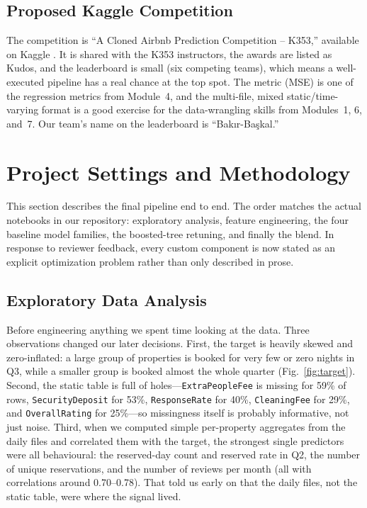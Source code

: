 \documentclass[journal]{IEEEtran}
\begin{document}
\subsection{Proposed Kaggle Competition}
The competition is ``A Cloned Airbnb Prediction Competition -- K353,'' available
on Kaggle \cite{k353comp}. It is shared with the K353 instructors, the awards
are listed as Kudos, and the leaderboard is small (six competing teams), which
means a well-executed pipeline has a real chance at the top spot. The metric
(MSE) is one of the regression metrics from Module~4, and the multi-file, mixed
static/time-varying format is a good exercise for the data-wrangling skills from
Modules~1, 6, and~7. Our team's name on the leaderboard is ``Bak{\i}r-Ba\c{s}kal.''

\section{Project Settings and Methodology}
\label{sec:method}
This section describes the final pipeline end to end. The order matches the
actual notebooks in our repository: exploratory analysis, feature engineering,
the four baseline model families, the boosted-tree retuning, and finally the
blend. In response to reviewer feedback, every custom component is now stated as
an explicit optimization problem rather than only described in prose.

\subsection{Exploratory Data Analysis}
Before engineering anything we spent time looking at the data. Three
observations changed our later decisions. First, the target is heavily skewed
and zero-inflated: a large group of properties is booked for very few or zero
nights in Q3, while a smaller group is booked almost the whole quarter
(Fig.~\ref{fig:target}). Second, the static table is full of
holes---\texttt{ExtraPeopleFee} is missing for 59\% of rows, \texttt{Security\-Deposit}
for 53\%, \texttt{ResponseRate} for 40\%, \texttt{CleaningFee} for 29\%, and
\texttt{OverallRating} for 25\%---so missingness itself is probably informative,
not just noise. Third, when we computed simple per-property aggregates from the
daily files and correlated them with the target, the strongest single predictors
were all behavioural: the reserved-day count and reserved rate in Q2, the number
of unique reservations, and the number of reviews per month (all with
correlations around 0.70--0.78). That told us early on that the daily files, not
the static table, were where the signal lived.
\end{document}
